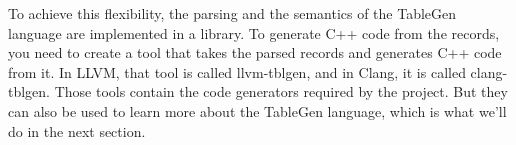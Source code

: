To achieve this flexibility, the parsing and the semantics of the TableGen language are implemented in a library. To generate C++ code from the records, you need to create a tool that takes the parsed records and generates C++ code from it. In LLVM, that tool is called llvm-tblgen, and in Clang, it is called clang-tblgen. Those tools contain the code generators required by the project. But they can also be used to learn more about the TableGen language, which is what we’ll do in the next section.






























